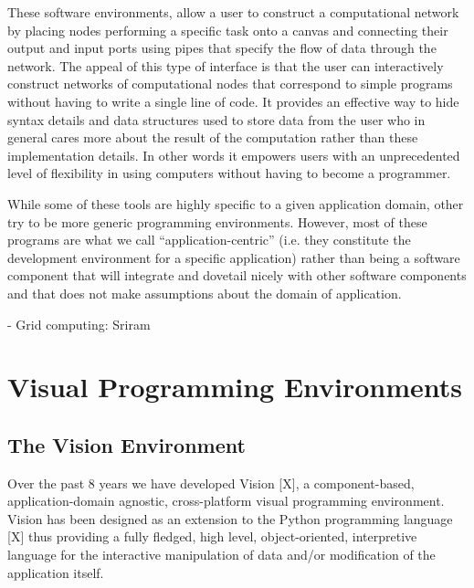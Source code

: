 \documentclass[conference]{IEEEtran}
\begin{document}
These software environments, allow a user to construct a computational
network by placing nodes performing a specific task onto a canvas and
connecting their output and input ports using pipes that specify the flow
of data through the network. The appeal of this type of interface is that
the user can interactively construct networks of computational nodes that
correspond to simple programs without having to write a single line of
code. It provides an effective way to hide syntax details and data
structures used to store data from the user who in general cares more about
the result of the computation rather than these implementation details. In
other words it empowers users with an unprecedented level of flexibility in
using computers without having to become a programmer.

While some of these tools are highly specific to a given application
domain, other try to be more generic programming environments. However,
most of these programs are what we call “application-centric” (i.e. they
constitute the development environment for a specific application) rather
than being a software component that will integrate and dovetail nicely
with other software components and that does not make assumptions about the
domain of application.


- Grid computing: Sriram

\section {Visual Programming Environments}

\subsection {The Vision Environment}



Over the past 8 years we have developed Vision [X], a component-based,
application-domain agnostic, cross-platform visual programming environment.
Vision has been designed as an extension to the Python programming language
[X] thus providing a fully fledged, high level, object-oriented,
interpretive language for the interactive manipulation of data and/or
modification of the application itself.
\end{document}
